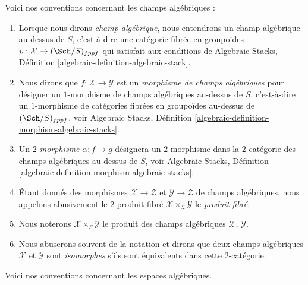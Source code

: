 \medskip\noindent
Voici nos conventions concernant les champs algébriques :
\begin{enumerate}
\item Lorsque nous dirons {\it champ algébrique}, nous entendrons un champ
algébrique au-dessus de $S$, c'est-à-dire une catégorie fibrée en groupoïdes
$p : \mathcal{X} \to (\Sch/S)_{fppf}$
qui satisfait aux conditions de
Algebraic Stacks, Définition \ref{algebraic-definition-algebraic-stack}.
\item Nous dirons que $f : \mathcal{X} \to \mathcal{Y}$ est un
{\it morphisme de champs algébriques} pour désigner un $1$-morphisme
de champs algébriques au-dessus de $S$, c'est-à-dire un $1$-morphisme de catégories fibrées
en groupoïdes au-dessus de $(\Sch/S)_{fppf}$, voir
Algebraic Stacks,
Définition \ref{algebraic-definition-morphism-algebraic-stacks}.
\item Un {\it $2$-morphisme} $\alpha : f \to g$ désignera
un $2$-morphisme dans la $2$-catégorie des champs algébriques au-dessus de
$S$, voir
Algebraic Stacks,
Définition \ref{algebraic-definition-morphism-algebraic-stacks}.
\item Étant donnés des morphismes $\mathcal{X} \to \mathcal{Z}$
et $\mathcal{Y} \to \mathcal{Z}$ de champs algébriques,
nous appelons abusivement le $2$-produit fibré
$\mathcal{X} \times_\mathcal{Z} \mathcal{Y}$ le {\it produit fibré}.
\item Nous noterons $\mathcal{X} \times_S \mathcal{Y}$ le
produit des champs algébriques $\mathcal{X}$, $\mathcal{Y}$.
\item Nous abuserons souvent de la notation et dirons que deux champs algébriques
$\mathcal{X}$ et $\mathcal{Y}$ sont {\it isomorphes} s'ils sont
équivalents dans cette $2$-catégorie.
\end{enumerate}
Voici nos conventions concernant les espaces algébriques.
